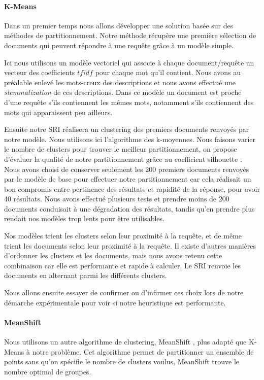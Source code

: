 \documentclass{article}
\begin{document}
\paragraph{K-Means}

Dans un premier temps nous allons développer une solution basée sur des méthodes de partitionnement. Notre méthode récupère une première sélection de documents qui peuvent répondre à une requête grâce à un modèle simple. 

Ici nous utilisons un modèle vectoriel qui associe à chaque document/requête un vecteur des coefficients $tfidf$ pour chaque mot qu'il contient. Nous avons au préalable enlevé les mots-creux des descriptions et nous avons effectué une \textit{stemmatization} de ces descriptions. Dans ce modèle un document est proche d'une requête s'ils contiennent les mêmes mots, notamment s'ils contiennent des mots qui apparaissent peu ailleurs.

Ensuite notre SRI réalisera un clustering des premiers documents renvoyés par notre modèle. Nous utilisons ici l'algorithme des k-moyennes. Nous faisons varier le nombre de clusters pour trouver le meilleur partitionnement, on propose d'évaluer la qualité de notre partitionnement grâce au coefficient silhouette \cite{rousseeuw87}. 
Nous avons choisi de conserver seulement les 200 premiers documents renvoyés par le modèle de base pour effectuer notre partitionnement car cela réalisait un bon compromis entre pertinence des résultats et rapidité de la réponse, pour avoir 40 résultats. Nous avons effectué plusieurs tests et prendre moins de 200 documents conduisait à une dégradation des résultats, tandis qu'en prendre plus rendait nos modèles trop lents pour être utilisables.

Nos modèles trient les clusters selon leur proximité à la requête, et de même trient les documents selon leur proximité à la requête. Il existe d'autres manières d'ordonner les clusters et les documents, mais nous avons retenu cette combinaison car elle est performante et rapide à calculer. Le SRI renvoie les documents en alternant parmi les différents clusters. 

Nous allons ensuite essayer de confirmer ou d'infirmer ces choix lors de notre démarche expérimentale pour voir si notre heuristique est performante. 

\paragraph{MeanShift}
Nous utilisons un autre algorithme de clustering, MeanShift \cite{fukunuga75}, plus adapté que K-Means à notre problème.
Cet algorithme permet de partitionner un ensemble de points sans qu'on spécifie le nombre de clusters voulus, MeanShift trouve le nombre optimal de groupes.
\end{document}
